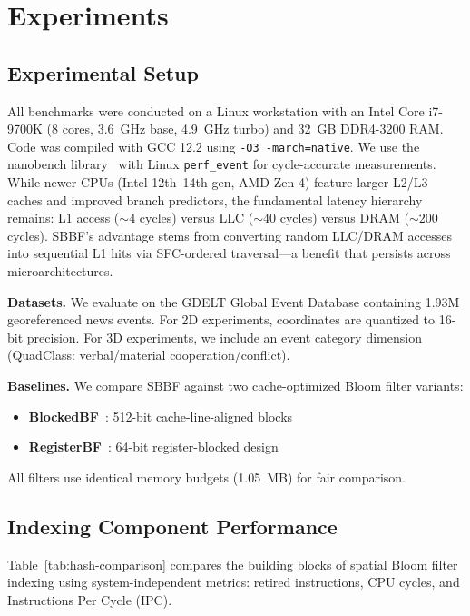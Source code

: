 \documentclass[conference,a4paper]{IEEEtran}
\begin{document}
\section{Experiments}

\subsection{Experimental Setup}
All benchmarks were conducted on a Linux workstation with an Intel Core i7-9700K (8 cores, 3.6~GHz base, 4.9~GHz turbo) and 32~GB DDR4-3200 RAM. Code was compiled with GCC 12.2 using \texttt{-O3 -march=native}. We use the nanobench library~\citep{nanobench} with Linux \texttt{perf\_event} for cycle-accurate measurements. While newer CPUs (Intel 12th--14th gen, AMD Zen 4) feature larger L2/L3 caches and improved branch predictors, the fundamental latency hierarchy remains: L1 access (${\sim}4$ cycles) versus LLC (${\sim}40$ cycles) versus DRAM (${\sim}200$ cycles). SBBF's advantage stems from converting random LLC/DRAM accesses into sequential L1 hits via SFC-ordered traversal---a benefit that persists across microarchitectures.

\textbf{Datasets.} We evaluate on the GDELT Global Event Database containing 1.93M georeferenced news events. For 2D experiments, coordinates are quantized to 16-bit precision. For 3D experiments, we include an event category dimension (QuadClass: verbal/material cooperation/conflict).

\textbf{Baselines.} We compare SBBF against two cache-optimized Bloom filter variants:
\begin{itemize}
    \item \textbf{BlockedBF}~\citep{Putze2009}: 512-bit cache-line-aligned blocks
    \item \textbf{RegisterBF}~\citep{Lang2019}: 64-bit register-blocked design
\end{itemize}
All filters use identical memory budgets (1.05~MB) for fair comparison.

\subsection{Indexing Component Performance}\label{sec:indexing-performance}
Table~\ref{tab:hash-comparison} compares the building blocks of spatial Bloom filter indexing using system-independent metrics: retired instructions, CPU cycles, and Instructions Per Cycle (IPC).
\end{document}

